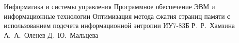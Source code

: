 \documentclass{bmstu}
\begin{document}
\makethesistitle
	{Информатика и системы управления}
	{Программное обеспечение ЭВМ и информационные технологии}
	{Оптимизация метода сжатия страниц памяти с использованием подсчета информационной энтропии}
	{ИУ7-83Б}
	{Р.~Р.~Хамзина}
	{А.~А.~Оленев}
	{}{}
	{Д.~Ю.~Мальцева}

\setcounter{page}{5}


\maketableofcontents








\makebibliography


\end{document}

